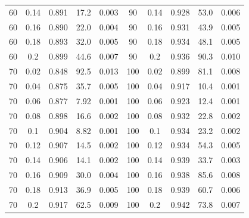 \documentclass[12pt]{article}
\begin{document}
\begin{spacing}{2.0}
\begin{table}[hb!]
\begin{tabular}{c c | c | c c ||c c | c | c c |}
                60&0.14&0.891&17.2&0.003	&	90&0.14&0.928&53.0&0.006\\
                60&0.16&0.890&22.0&0.004	&	90&0.16&0.931&43.9&0.005\\
                60&0.18&0.893&32.0&0.005	&	90&0.18&0.934&48.1&0.005\\
                60&0.2&0.899&44.6&0.007	&	90&0.2&0.936&90.3&0.010\\
                70&0.02&0.848&92.5&0.013	&	100&0.02&0.899&81.1&0.008\\
                70&0.04&0.875&35.7&0.005	&	100&0.04&0.917&10.4&0.001\\
                70&0.06&0.877&7.92&0.001	&	100&0.06&0.923&12.4&0.001\\
                70&0.08&0.898&16.6&0.002	&	100&0.08&0.932&22.8&0.002\\
                70&0.1&0.904&8.82&0.001	&	100&0.1&0.934&23.2&0.002\\
                70&0.12&0.907&14.5&0.002	&	100&0.12&0.934&54.3&0.005\\
                70&0.14&0.906&14.1&0.002	&	100&0.14&0.939&33.7&0.003\\
                70&0.16&0.909&30.0&0.004	&	100&0.16&0.938&85.6&0.008\\
                70&0.18&0.913&36.9&0.005	&	100&0.18&0.939&60.7&0.006\\
                70&0.2&0.917&62.5&0.009	&	100&0.2&0.942&73.8&0.007\\
				\hline
			\end{tabular}
			\end{table}


\end{spacing}
\end{document}
